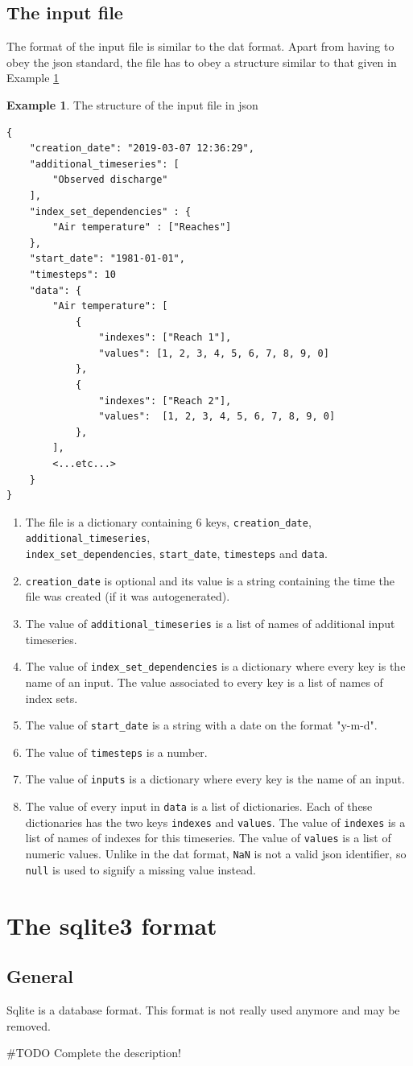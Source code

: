 \documentclass[11pt]{article}
\theoremstyle{definition}
\newtheorem{myexample}{Example}
\newenvironment{example}%
  {\begin{lrbox}{\examplebox}%
   \begin{minipage}{\dimexpr\linewidth-2\fboxsep}
   \begin{myexample}}%
  {\end{myexample}%
   \end{minipage}%
   \end{lrbox}%
   \begin{trivlist}
     \item[]\colorbox{silver}{\usebox\examplebox}
   \end{trivlist}}
\begin{document}
\subsection{The input file}
The format of the input file is similar to the dat format. Apart from having to obey the json standard, the file has to obey a structure similar to that given in Example \ref{ex:jsonin}

\begin{example}\label{ex:jsonin}
The structure of the input file in json
\begin{lstlisting}
{
	"creation_date": "2019-03-07 12:36:29",
	"additional_timeseries": [
		"Observed discharge"
	],
	"index_set_dependencies" : {
		"Air temperature" : ["Reaches"]
	},
	"start_date": "1981-01-01",
	"timesteps": 10
	"data": {
		"Air temperature": [
			{
				"indexes": ["Reach 1"],
				"values": [1, 2, 3, 4, 5, 6, 7, 8, 9, 0]
			},
			{
				"indexes": ["Reach 2"],
				"values":  [1, 2, 3, 4, 5, 6, 7, 8, 9, 0]
			},
		],
		<...etc...>
	}
}
\end{lstlisting}
\end{example}

\begin{enumerate}[i]
\item The file is a dictionary containing 6 keys, {\tt creation\_date}, {\tt additional\_timeseries}, \\{\tt index\_set\_dependencies}, {\tt start\_date}, {\tt timesteps} and {\tt data}.
\item {\tt creation\_date} is optional and its value is a string containing the time the file was created (if it was autogenerated).
\item The value of {\tt additional\_timeseries} is a list of names of additional input timeseries.
\item The value of {\tt index\_set\_dependencies} is a dictionary where every key is the name of an input. The value associated to every key is a list of names of index sets.
\item The value of {\tt start\_date} is a string with a date on the format "y-m-d".
\item The value of {\tt timesteps} is a number.
\item The value of {\tt inputs} is a dictionary where every key is the name of an input.
\item The value of every input in {\tt data} is a list of dictionaries. Each of these dictionaries has the two keys {\tt indexes} and {\tt values}. The value of {\tt indexes} is a list of names of indexes for this timeseries. The value of {\tt values} is a list of numeric values. Unlike in the dat format, {\tt NaN} is not a valid json identifier, so {\tt null} is used to signify a missing value instead.
\end{enumerate}

\section{The sqlite3 format}

\subsection{General}

Sqlite is a database format. This format is not really used anymore and may be removed.

\#TODO Complete the description!



\end{document}
